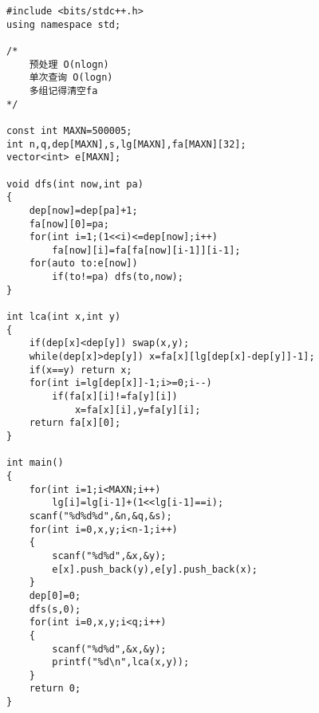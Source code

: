\begin{lstlisting}
#include <bits/stdc++.h>
using namespace std;

/*
    预处理 O(nlogn)
    单次查询 O(logn)
    多组记得清空fa
*/

const int MAXN=500005;
int n,q,dep[MAXN],s,lg[MAXN],fa[MAXN][32];
vector<int> e[MAXN];

void dfs(int now,int pa)
{
    dep[now]=dep[pa]+1;
    fa[now][0]=pa;
    for(int i=1;(1<<i)<=dep[now];i++)
        fa[now][i]=fa[fa[now][i-1]][i-1];
    for(auto to:e[now])
        if(to!=pa) dfs(to,now);
}

int lca(int x,int y)
{
    if(dep[x]<dep[y]) swap(x,y);
    while(dep[x]>dep[y]) x=fa[x][lg[dep[x]-dep[y]]-1];
    if(x==y) return x;
    for(int i=lg[dep[x]]-1;i>=0;i--)
        if(fa[x][i]!=fa[y][i])
            x=fa[x][i],y=fa[y][i];
    return fa[x][0];
}

int main()
{
    for(int i=1;i<MAXN;i++)
        lg[i]=lg[i-1]+(1<<lg[i-1]==i);
    scanf("%d%d%d",&n,&q,&s);
    for(int i=0,x,y;i<n-1;i++)
    {
        scanf("%d%d",&x,&y);
        e[x].push_back(y),e[y].push_back(x);
    }
    dep[0]=0;
    dfs(s,0);
    for(int i=0,x,y;i<q;i++)
    {
        scanf("%d%d",&x,&y);
        printf("%d\n",lca(x,y));
    }
    return 0;
}
\end{lstlisting}